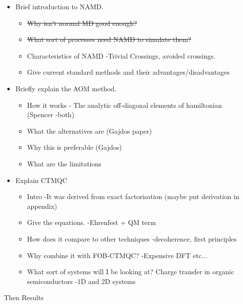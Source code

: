 \begin{itemize}
\item Brief introduction to NAMD.
\begin{itemize}
\item \st{Why isn't normal MD good enough?}
\item \st{What sort of processes need NAMD to simulate them?}
\item Characteristics of NAMD -Trivial Crossings, avoided crossings.
\item Give current standard methods and their advantages/disadvantages
\end{itemize}
\item Briefly explain the AOM method.
\begin{itemize}
\item How it works - The analytic off-diagonal elements of hamiltonian (Spencer -both)
\item What the alternatives are (Gajdos paper)
\item Why this is preferable (Gajdos)
\item What are the limitations
\end{itemize}
\item Explain CTMQC
\begin{itemize}
\item Intro -It was derived from exact factorisation (maybe put derivation in appendix)
\item Give the equations. -Ehrenfest + QM term
\item How does it compare to other techniques -decoherence, first principles
\item Why combine it with FOB-CTMQC? -Expensive DFT etc...
\item What sort of systems will I be looking at? Charge transfer in organic semiconductors -1D and 2D systems
\end{itemize}

\end{itemize}
Then Results
